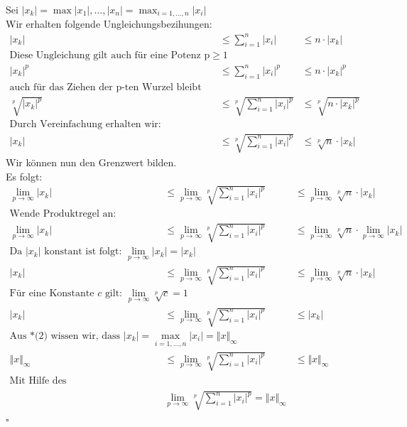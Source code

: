 \documentclass{llncs}
\begin{document}
Sei $|x_k|=\max{|x_1|,...,|x_n|}=\max_{i=1,...,n}{|x_i|} $\\
Wir erhalten folgende Ungleichungsbezihungen:
\begin{align*}
|x_k| &\le \sum_{i=1}^n{|x_i|} &\le n \cdot |x_k|\\
\text{Diese Ungleichung gilt auch für eine Potenz p}\ge 1\\
|x_k|^p &\le \sum_{i=1}^n{|x_i|^p} &\le n \cdot |x_k|^p\\
\text{auch für das Ziehen der p-ten Wurzel bleibt die Ungleichung gültig}\\
\sqrt[p]{|x_k|^p} &\le \sqrt[p]{\sum_{i=1}^n{|x_i|^p}} &\le\sqrt[p]{ n \cdot |x_k|^p}\\
\text{Durch Vereinfachung erhalten wir:}\\
|x_k| &\le \sqrt[p]{\sum_{i=1}^n{|x_i|^p}} &\le\sqrt[p]{ n }\cdot |x_k|
\end{align*}
Wir können nun den Grenzwert bilden.\\
Es folgt:\\
\begin{align*}
\lim_{p\to\infty} |x_k| &\le \lim_{p\to\infty} \sqrt[p]{\sum_{i=1}^n{|x_i|^p}} &\le \lim_{p\to\infty}\sqrt[p]{ n }\cdot |x_k|\\
\text{Wende Produktregel an:}\\
\lim_{p\to\infty} |x_k| &\le \lim_{p\to\infty} \sqrt[p]{\sum_{i=1}^n{|x_i|^p}} &\le \lim_{p\to\infty}\sqrt[p]{ n }\cdot \lim_{p\to\infty}|x_k|\\
\text{Da }|x_k| \text{ konstant ist folgt: } \lim_{p\to\infty} |x_k|=|x_k|\\
|x_k| &\le \lim_{p\to\infty} \sqrt[p]{\sum_{i=1}^n{|x_i|^p}} &\le \lim_{p\to\infty}\sqrt[p]{ n }\cdot |x_k|\\
\text{Für eine Konstante } c \text{ gilt: } \lim_{p\to\infty} \sqrt[p]{c} = 1\\
|x_k| &\le \lim_{p\to\infty} \sqrt[p]{\sum_{i=1}^n{|x_i|^p}} &\le |x_k|\\
\text{Aus *(2) wissen wir, dass }|x_k|=\max_{i=1,...,n}{|x_i|}=\Vert x \Vert_\infty\\
\Vert x \Vert_\infty &\le \lim_{p\to\infty} \sqrt[p]{\sum_{i=1}^n{|x_i|^p}} &\le \Vert x \Vert_\infty\\
\text{Mit Hilfe des Einschnürungssatzes (Sandwichsatz) folgt:}\\
&\lim_{p\to\infty} \sqrt[p]{\sum_{i=1}^n{|x_i|^p}} = \Vert x \Vert_\infty &
\end{align*}\hfill$\square$
\end{document}
